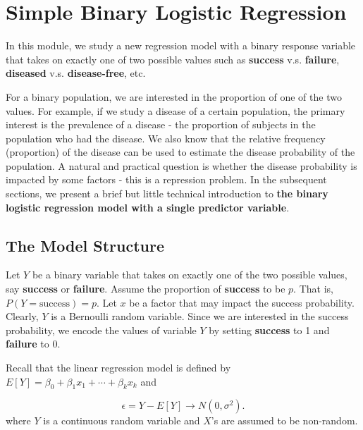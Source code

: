 \documentclass[
]{book}
\begin{document}
\hfill\break

\hypertarget{simple-binary-logistic-regression}{%
\section{Simple Binary Logistic Regression}\label{simple-binary-logistic-regression}}

In this module, we study a new regression model with a binary response variable that takes on exactly one of two possible values such as \textbf{success} v.s. \textbf{failure}, \textbf{diseased} v.s. \textbf{disease-free}, etc.

For a binary population, we are interested in the proportion of one of the two values. For example, if we study a disease of a certain population, the primary interest is the prevalence of a disease - the proportion of subjects in the population who had the disease. We also know that the relative frequency (proportion) of the disease can be used to estimate the disease probability of the population. A natural and practical question is whether the disease probability is impacted by some factors - this is a repression problem. In the subsequent sections, we present a brief but little technical introduction to \textbf{\color{red}the binary logistic regression model with a single predictor variable}.

\hypertarget{the-model-structure}{%
\subsection{The Model Structure}\label{the-model-structure}}

Let \(Y\) be a binary variable that takes on exactly one of the two possible values, say \textbf{success} or \textbf{failure}. Assume the proportion of \textbf{success} to be \(p\). That is, \(P(Y = \text{success}) = p\). Let \(x\) be a factor that may impact the success probability. Clearly, \(Y\) is a Bernoulli random variable. Since we are interested in the success probability, we encode the values of variable \(Y\) by setting \textbf{success} to 1 and \textbf{failure} to 0.

Recall that the linear regression model is defined by \(E[Y] = \beta_0 + \beta_1 x_1 + \cdots + \beta_k x_k\) and

\[
\epsilon = Y - E[Y] \to N(0, \sigma^2).
\]
where \(Y\) is a continuous random variable and \(X\)'s are assumed to be non-random.

\hfill\break
\end{document}
